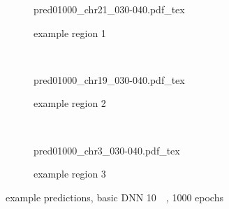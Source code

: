 \begin{figure}[p]
    \begin{subfigure}{\textwidth}
        \centering
        \scriptsize
        {pred01000_chr21_030-040.pdf_tex}
        \caption{example  region 1} \label{fig:results:basic10k_r1}
    \end{subfigure}\\[6mm]
    \begin{subfigure}{\textwidth}
        \centering
        \scriptsize
        {pred01000_chr19_030-040.pdf_tex}
        \caption{example region 2} \label{fig:results:basic10k_r2}
    \end{subfigure}\\[6mm]
    \begin{subfigure}{\textwidth}
        \centering
        \scriptsize
        {pred01000_chr3_030-040.pdf_tex}
        \caption{example region 3} \label{fig:results:basic10k_r3}
    \end{subfigure}
    \caption{example predictions, basic DNN \SI{10}{\kilo\bp}, 1000 epochs}
\end{figure}

